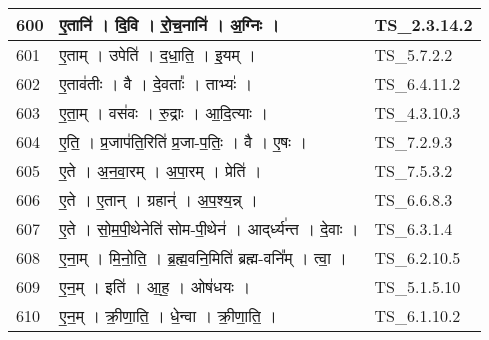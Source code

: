 \documentclass[17pt]{extarticle}
\begin{document}
\begin{longtable}{||p{0.4in}||p{4.9in}||p{0.9in}||}
    \hline
        
    600 & ए॒तानि॑   ।   दि॒वि   ।   रो॒च॒नानि॑   ।   अ॒ग्निः   ।    & TS\_2.3.14.2       \\
    
    \hline
        
    601 & ए॒ताम्   ।   उपेति॑   ।   द॒धा॒ति॒   ।   इ॒यम्   ।    & TS\_5.7.2.2       \\
    
    \hline
        
    602 & ए॒ताव॑तीः   ।   वै   ।   दे॒वताः᳚   ।   ताभ्यः॑   ।    & TS\_6.4.11.2       \\
    
    \hline
        
    603 & ए॒ता॒म्   ।   वस॑वः   ।   रु॒द्राः   ।   आ॒दि॒त्याः   ।    & TS\_4.3.10.3       \\
    
    \hline
        
    604 & ए॒ति॒   ।   प्र॒जाप॑ति॒रिति॑ प्र॒जा{-}प॒तिः॒   ।   वै   ।   ए॒षः   ।    & TS\_7.2.9.3       \\
    
    \hline
        
    605 & ए॒ते   ।   अ॒न॒वा॒रम्   ।   अ॒पा॒रम्   ।   प्रेति॑   ।    & TS\_7.5.3.2       \\
    
    \hline
        
    606 & ए॒ते   ।   ए॒तान्   ।   ग्रहान्॑   ।   अ॒प॒श्य॒न्न्   ।    & TS\_6.6.8.3       \\
    
    \hline
        
    607 & ए॒ते   ।   सो॒म॒पी॒थेनेति॑ सोम{-}पी॒थेन॑   ।   आद्‌र्ध्य॑न्त   ।   दे॒वाः   ।    & TS\_6.3.1.4       \\
    
    \hline
        
    608 & ए॒ना॒म्   ।   मि॒नो॒ति॒   ।   ब्र॒ह्म॒वनि॒मिति॑ ब्रह्म{-}वनि᳚म्   ।   त्वा॒   ।    & TS\_6.2.10.5       \\
    
    \hline
        
    609 & ए॒न॒म्   ।   इति॑   ।   आ॒ह॒   ।   ओष॑धयः   ।    & TS\_5.1.5.10       \\
    
    \hline
        
    610 & ए॒न॒म्   ।   क्री॒णा॒ति॒   ।   धे॒न्वा   ।   क्री॒णा॒ति॒   ।    & TS\_6.1.10.2       \\
    

\end{longtable}
\end{document}
